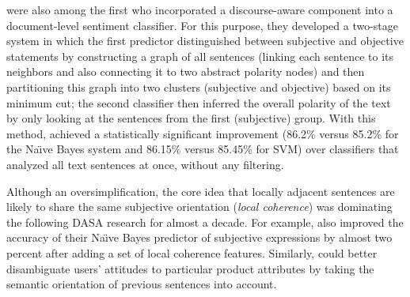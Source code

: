 \documentclass[11pt]{article}
\begin{document}
 were also among the first who incorporated a
discourse-aware component into a document-level sentiment classifier.
For this purpose, they developed a two-stage system in which the first
predictor distinguished between subjective and objective statements by
constructing a graph of all sentences (linking each sentence to its
neighbors and also connecting it to two abstract polarity nodes) and
then partitioning this graph into two clusters (subjective and
objective) based on its minimum cut; the second classifier then
inferred the overall polarity of the text by only looking at the
sentences from the first (subjective) group.  With this method,
 achieved a statistically significant improvement
(86.2\% versus 85.2\% for the Na\"{\i}ve Bayes system and 86.15\%
versus 85.45\% for SVM) over classifiers that analyzed all text
sentences at once, without any filtering.

Although an oversimplification, the core idea that locally adjacent
sentences are likely to share the same subjective orientation
(\emph{local coherence}) was dominating the following DASA research
for almost a decade.  For example,  also improved the
accuracy of their Na\"{\i}ve Bayes predictor of subjective expressions
by almost two percent after adding a set of local coherence features.
Similarly,  could better disambiguate users' attitudes to
particular product attributes by taking the semantic orientation of
previous sentences into account.
\end{document}
